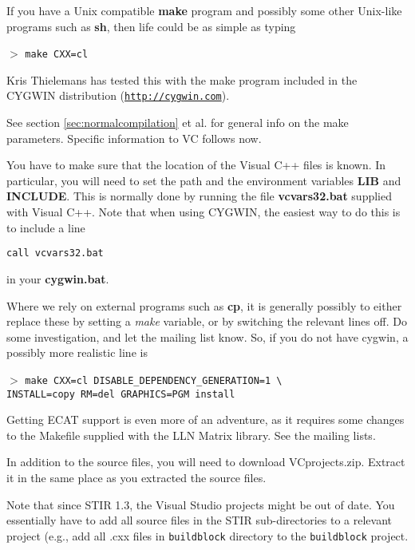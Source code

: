 \documentclass{article}
\def\R2Lurl#1#2{\mbox{\href{#1}{\tt #2}}}
\newcommand{\cmdline}[1]{\par \noindent $>$ \texttt{#1}\par}
\begin{document}
{ 
}


If you have a Unix compatible \textbf{make} program and possibly some 
other Unix-like programs such as \textbf{sh}, then life could be as 
simple as typing
\cmdline{make CXX=cl}


Kris Thielemans has tested this with the make program included in the CYGWIN 
distribution (\R2Lurl{http://cygwin.com }{http://cygwin.com}). 



See section \ref{sec:normalcompilation} et al. for general info on the make parameters. 
Specific information to VC follows now.



You have to make sure that the location of the Visual C++ files 
is known. In particular, you will need to set the path and the 
environment variables \textbf{LIB} and \textbf{INCLUDE}. This is normally 
done by running the file \textbf{vcvars32.bat} supplied with Visual 
C++. Note that when using CYGWIN, the easiest way to do this 
is to include a line 
\begin{verbatim}
call vcvars32.bat
\end{verbatim} 
in your  \textbf{cygwin.bat}.



Where we rely on external programs such as \textbf{cp}, it is generally 
possibly to either replace these by setting a \textit{make} variable, 
or by switching the relevant lines off. Do some investigation, 
and let the mailing list know. So, if you do not have cygwin, 
a possibly more realistic line is
\cmdline{make CXX=cl DISABLE\_DEPENDENCY\_GENERATION=1 {\textbackslash}\\
 INSTALL=copy 
RM=del GRAPHICS=PGM install}


Getting ECAT support is even more of an adventure, as it requires 
some changes to the Makefile supplied with the LLN Matrix library. 
See the mailing lists.

{ 
}

In addition to the source files, you will need to download VCprojects.zip. 
Extract it in the same place as you extracted the source files. 

Note that since STIR 1.3, the Visual Studio projects might be 
out of date. You essentially have to add all source files in the
STIR sub-directories to a relevant project (e.g., add 
all .cxx files in \texttt{buildblock} directory to the \texttt{buildblock}
project.
\end{document}
